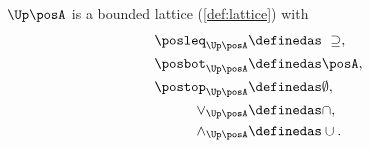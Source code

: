 \begin{lemma}
    \label{lem:u_bounded_lat}
    $\Up \posA$ is a bounded lattice (\cref{def:lattice}) with
    \begin{equation}
        \begin{aligned}
            \posleq_{\Up \posA} & \definedas \ \supseteq, \\
            \posbot_{\Up \posA} & \definedas \posA,       \\
            \postop_{\Up \posA} & \definedas \emptyset,   \\
            \vee_{\Up \posA}    & \definedas \cap,        \\
            \wedge_{\Up \posA}  & \definedas \cup.
        \end{aligned}
    \end{equation}
\end{lemma}
